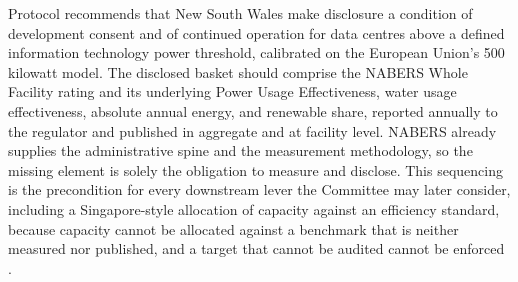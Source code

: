 Protocol recommends that New South Wales make disclosure a condition of development consent and of continued operation for data centres above a defined information technology power threshold, calibrated on the European Union's 500 kilowatt model. The disclosed basket should comprise the NABERS Whole Facility rating and its underlying Power Usage Effectiveness, water usage effectiveness, absolute annual energy, and renewable share, reported annually to the regulator and published in aggregate and at facility level. NABERS already supplies the administrative spine and the measurement methodology, so the missing element is solely the obligation to measure and disclose. This sequencing is the precondition for every downstream lever the Committee may later consider, including a Singapore-style allocation of capacity against an efficiency standard, because capacity cannot be allocated against a benchmark that is neither measured nor published, and a target that cannot be audited cannot be enforced \autocite{imanHiddenCostsIntelligence2025, hackerSustainableAIRegulation2024}.
